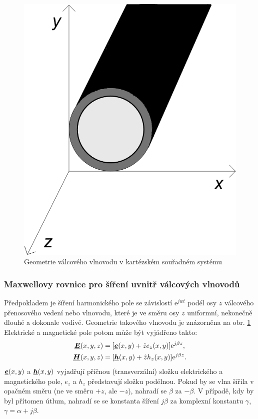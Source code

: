 \documentclass[12pt,a4paper,oneside]{article}
\numberwithin{equation}{section} %
\numberwithin{figure}{section} %
\numberwithin{table}{section} %
\newcommand{\me}{\mathrm{e}} %
\renewcommand{\vec}[1]{\mbox{\boldmath$#1$}} %
\newcommand{\faz}[1]{{\underline{#1}}} %
\begin{document}
\begin{figure} 
\begin{center}
\includegraphics{geometrie.png}
\caption{Geometrie válcového vlnovodu v kartézském souřadném systému}
\label{geometrie}
\end{center}
\end{figure}

\subsubsection{Maxwellovy rovnice pro šíření uvnitř válcových vlnovodů}
Předpokladem je šíření harmonického pole se závislostí $\me ^{jwt}$ podél osy $z$ válcového přenosového vedení nebo vlnovodu, které je ve směru osy $z$ uniformní, nekonečně dlouhé a dokonale vodivé. Geometrie takového vlnovodu je znázorněna na obr. \ref{geometrie} Elektrické a magnetické pole potom může být vyjádřeno takto:
\begin{subequations}
\label{hromadna}
\begin{align}
\faz{\vec{E}}(x, y, z)&=[\faz{\vec{e}}(x, y) + \hat{z}e_z(x, y)] \me ^{j\beta z} ,
\\
\faz{\vec{H}}(x, y, z)&=[\faz{\vec{h}}(x, y) + \hat{z}h_z(x, y)] \me ^{j\beta z} .
\end{align}
\end{subequations}
$\faz{\vec{e}}(x,y)$ a $\faz{\vec{h}}(x,y)$ vyjadřují příčnou (transverzální) složku elektrického a magnetického pole, $e_z$ a $h_z$ představují složku podélnou. Pokud by se vlna šířila v opačném směru (ne ve směru $+z$, ale $-z$), nahradí se $\beta$ za $-\beta$. V případě, kdy by byl přítomen útlum, nahradí se se konstanta šíření $j \beta$ za komplexní konstantu $\gamma$, $\gamma = \alpha + j \beta$.
\end{document}
